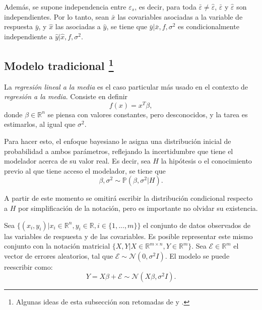Adem\'as, se supone independencia entre $\varepsilon_s$, es decir, para toda $\bar{\varepsilon} \neq \hat{\varepsilon}$, $\bar{\varepsilon}$ y $\hat{\varepsilon}$ son independientes. Por lo tanto, sean $\bar{x}$ las covariables asociadas a la variable de respuesta $\bar{y}$, y $\hat{x}$ las asociadas a $\hat{y}$, se tiene que $\bar{y} | \bar{x}, f, \sigma^2$ es condicionalmente independiente a $\hat{y} | \hat{x}, f, \sigma^2$.


\subsection[Modelo tradicional]{
    Modelo tradicional
    \footnote{Algunas ideas de esta subsecci\'on son retomadas de \cite{Denison_BayesMethods} y \cite{Bannerjee_BayLinMod}.}
}

La \textit{regresi\'on lineal a la media} es el caso particular m\'as usado en el contexto de \textit{regresi\'on a la media}. Consiste en definir
\begin{equation*}
    f(x) = x^T\beta,
\end{equation*}
donde $\beta \in \mathbb{R}^n$ se piensa con valores constantes, pero desconocidos, y la tarea es estimarlos, al igual que $\sigma^2$.

Para hacer esto, el enfoque bayesiano le asigna una distribución inicial de probabilidad a ambos par\'ametros, reflejando la incertidumbre que tiene el modelador acerca de su valor real. Es decir, sea $H$ la hip\'otesis o el conocimiento previo al que tiene acceso el modelador, se tiene que 
\begin{equation*}
    \beta,\sigma^2 \sim \mathbb{P}(\beta,\sigma^2|H).
\end{equation*}

A partir de este momento se omitir\'a escribir la distribuci\'on condicional respecto a $H$ por simplificaci\'on de la notaci\'on, pero es importante no olvidar su existencia.

Sea $\{(x_i,y_i)| x_i \in \mathbb{R}^n, y_i \in \mathbb{R}, i \in \{1,...,m\} \}$ el conjunto de datos observados de las variables de respuesta y de las covariables. Es posible representar este mismo conjunto con la notaci\'on matricial $\{X,Y | X \in \mathbb{R}^{m \times n}, Y \in \mathbb{R}^m\}$. Sea $\mathcal{E} \in \mathbb{R}^m$ el vector de errores aleatorios, tal que $\mathcal{E} \sim \mathcal{N}(0,\sigma^2 I)$. El modelo se puede reescribir como:
\begin{equation*}
    Y = X\beta + \mathcal{E} \sim \mathcal{N}(X\beta,\sigma^2 I).
\end{equation*}

